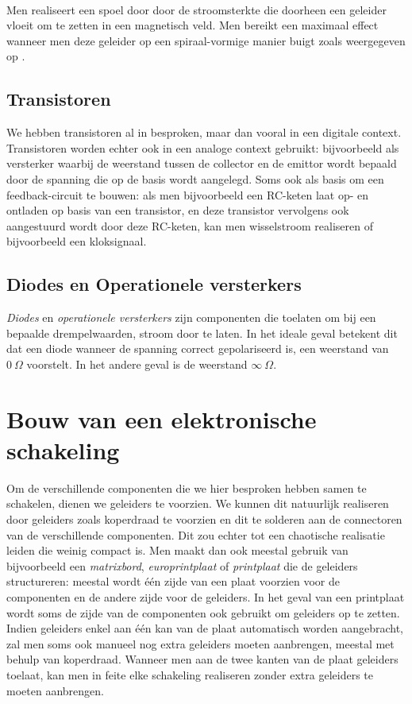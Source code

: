 \paragraph{}
Men realiseert een spoel door door de stroomsterkte die doorheen een geleider vloeit om te zetten in een magnetisch veld. Men bereikt een maximaal effect wanneer men deze geleider op een spiraal-vormige manier buigt zoals weergegeven op .


\subsection{Transistoren}
We hebben transistoren al in \chpref{} besproken, maar dan vooral in een digitale context. Transistoren worden echter ook in een analoge context gebruikt: bijvoorbeeld als versterker waarbij de weerstand tussen de collector en de emittor wordt bepaald door de spanning die op de basis wordt aangelegd. Soms ook als basis om een feedback-circuit te bouwen: als men bijvoorbeeld een RC-keten laat op- en ontladen op basis van een transistor, en deze transistor vervolgens ook aangestuurd wordt door deze RC-keten, kan men wisselstroom realiseren of bijvoorbeeld een kloksignaal.
\subsection{Diodes en Operationele versterkers}
\emph{Diodes} en \emph{operationele versterkers} zijn componenten die toelaten om bij een bepaalde drempelwaarden, stroom door te laten. In het ideale geval betekent dit dat een diode wanneer de spanning correct gepolariseerd is, een weerstand van $0~\Omega$ voorstelt. In het andere geval is de weerstand $\infty~\Omega$.
\paragraph{}
\section{Bouw van een elektronische schakeling}
Om de verschillende componenten die we hier besproken hebben samen te schakelen, dienen we geleiders te voorzien. We kunnen dit natuurlijk realiseren door geleiders zoals koperdraad te voorzien en dit te solderen aan de connectoren van de verschillende componenten. Dit zou echter tot een chaotische realisatie leiden die weinig compact is. Men maakt dan ook meestal gebruik van bijvoorbeeld een \emph{matrixbord}, \emph{europrintplaat} of \emph{printplaat} die de geleiders structureren: meestal wordt \'e\'en zijde van een plaat voorzien voor de componenten en de andere zijde voor de geleiders. In het geval van een printplaat wordt soms de zijde van de componenten ook gebruikt om geleiders op te zetten. Indien geleiders enkel aan \'e\'en kan van de plaat automatisch worden aangebracht, zal men soms ook manueel nog extra geleiders moeten aanbrengen, meestal met behulp van koperdraad. Wanneer men aan de twee kanten van de plaat geleiders toelaat, kan men in feite elke schakeling realiseren zonder extra geleiders te moeten aanbrengen.
